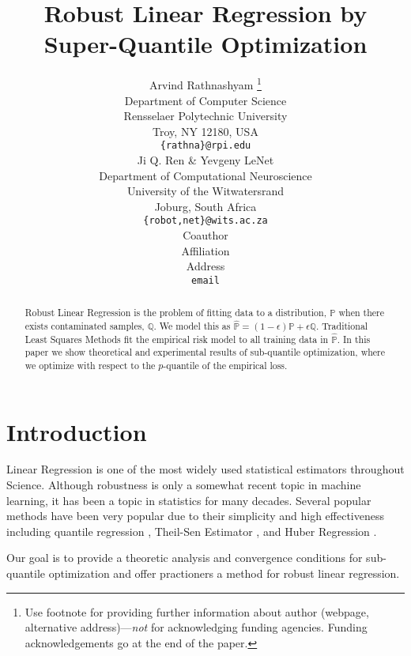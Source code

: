 \documentclass{article} %
\title{Robust Linear Regression by Super-Quantile Optimization}
\author{Arvind Rathnashyam \thanks{ Use footnote for providing further information
		about author (webpage, alternative address)---\emph{not} for acknowledging
		funding agencies.  Funding acknowledgements go at the end of the paper.} \\
	Department of Computer Science\\
	Rensselaer Polytechnic University\\
	Troy, NY 12180, USA \\
	\texttt{\{rathna\}@rpi.edu} \\
	\And
	Ji Q. Ren \& Yevgeny LeNet \\
	Department of Computational Neuroscience \\
	University of the Witwatersrand \\
	Joburg, South Africa \\
	\texttt{\{robot,net\}@wits.ac.za} \\
	\AND
	Coauthor \\
	Affiliation \\
	Address \\
	\texttt{email}
}
\begin{document}
	
	
	\maketitle
	
	\begin{abstract}
		Robust Linear Regression is the problem of fitting data to a distribution, $\displaystyle \mathbb{P}$ when there exists contaminated samples, $\displaystyle \mathbb{Q}$. We model this as $\displaystyle \hat{\mathbb{P}} = (1-\epsilon)\mathbb{P} + \epsilon\mathbb{Q}$. Traditional Least Squares Methods fit the empirical risk model to all training data in $\displaystyle \hat{\mathbb{P}}$. In this paper we show theoretical and experimental results of sub-quantile optimization, where we optimize with respect to the $p$-quantile of the empirical loss.
	\end{abstract}
	
	\section{Introduction}
	Linear Regression is one of the most widely used statistical estimators throughout Science. Although robustness is only a somewhat recent topic in machine learning, it has been a topic in statistics for many decades. Several popular methods have been very popular due to their simplicity and high effectiveness including quantile regression \cite{quantile-regression}, Theil-Sen Estimator \cite{thiel-sen}, and Huber Regression \cite{Huber2009}.
	
	Our goal is to provide a theoretic analysis and convergence conditions for sub-quantile optimization and offer practioners a method for robust linear regression.
\end{document}
